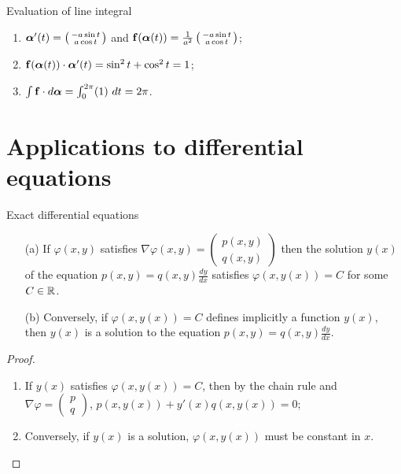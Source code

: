 {Evaluation of line integral}


\begin{enumerate}
    \item \(\boldsymbol{\alpha}'(t) = \left(\begin{smallmatrix}
                  -a \sin t \\ a \cos t
              \end{smallmatrix}\right)\) and \(\mathbf{f}(\boldsymbol{\alpha}(t)) = \frac{1}{a^2} \left(\begin{smallmatrix}
                  -a \sin t \\ a \cos t
              \end{smallmatrix}\right)   \);
    \item \(\mathbf{f}(\boldsymbol{\alpha}(t)) \cdot \boldsymbol{\alpha}'(t) = \sin^2 t + \cos^2 t = 1  \);
    \item \(\int \mathbf{f} \cdot d\boldsymbol{\alpha} = \int_{0}^{2\pi} (1) \ dt = 2\pi \).
\end{enumerate}



\section{Applications to differential equations}



 {Exact  differential equations {}}

\begin{theorem}
    \begin{enumerate}
        \item[(a)]         If \(\varphi(x,y)\) satisfies
              \(\nabla \varphi(x,y) =   \left(\begin{smallmatrix}
                      p(x,y) \\ q(x,y)
                  \end{smallmatrix}\right)\)
              then the solution \(y(x)\) of the equation \(p(x,y) = q(x,y) \frac{d y}{d x}\) satisfies \(\varphi(x,y(x))=C\) for some \(C\in \mathbb{R}\).
        \item[(b)] Conversely, if  \(\varphi(x,y(x))=C\)  defines implicitly a function \(y(x)\), then \(y(x)\) is a solution to the equation  \(p(x,y) = q(x,y) \frac{d y}{d x}\).
    \end{enumerate}
\end{theorem}

\begin{proof}
    \begin{enumerate}
        \item If \(y(x)\) satisfies  \(\varphi(x,y(x))=C\), then by the chain rule and \(\nabla \varphi =   \left(\begin{smallmatrix}
                  p \\ q
              \end{smallmatrix}\right)\), \(p(x,y(x)) + y'(x) q(x,y(x)) = 0\);
        \item Conversely, if \(y(x)\) is a solution, \(\varphi(x,y(x))\) must be constant in \(x\). \qedhere
    \end{enumerate}
\end{proof}

